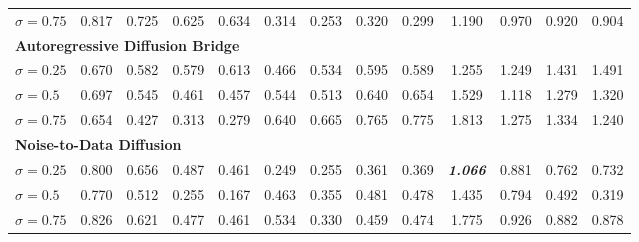 \begin{table}[h]
{\begin{tabular}{lcccccccccccc}
$\sigma = 0.75$ & 0.817 & 0.725 & 0.625 & 0.634 & 0.314 & 0.253 & 0.320 & 0.299 & 1.190 & 0.970 & 0.920 & 0.904 \\
\multicolumn{13}{l}{\cellcolor{gray!25}\textbf{Autoregressive Diffusion Bridge}} \\
$\sigma = 0.25$ & 0.670 & 0.582 & 0.579 & 0.613 & 0.466 & 0.534 & 0.595 & 0.589 & 1.255 & 1.249 & 1.431 & 1.491 \\
$\sigma = 0.5$ & 0.697 & 0.545 & 0.461 & 0.457 & 0.544 & 0.513 & 0.640 & 0.654 & 1.529 & 1.118 & 1.279 & 1.320 \\
$\sigma = 0.75$ & 0.654 & 0.427 & 0.313 & 0.279 & 0.640 & 0.665 & 0.765 & 0.775 & 1.813 & 1.275 & 1.334 & 1.240 \\
\multicolumn{13}{l}{\cellcolor{gray!25}\textbf{Noise-to-Data Diffusion}} \\
$\sigma = 0.25$ & 0.800 & 0.656 & 0.487 & 0.461 & 0.249 & 0.255 & 0.361 & 0.369 & \textbf{\textit{1.066}} & 0.881 & 0.762 & 0.732 \\
$\sigma = 0.5$ & 0.770 & 0.512 & 0.255 & 0.167 & 0.463 & 0.355 & 0.481 & 0.478 & 1.435 & 0.794 & 0.492 & 0.319 \\
$\sigma = 0.75$ & 0.826 & 0.621 & 0.477 & 0.461 & 0.534 & 0.330 & 0.459 & 0.474 & 1.775 & 0.926 & 0.882 & 0.878 \\
\bottomrule
\end{tabular}%
}
\end{table}
